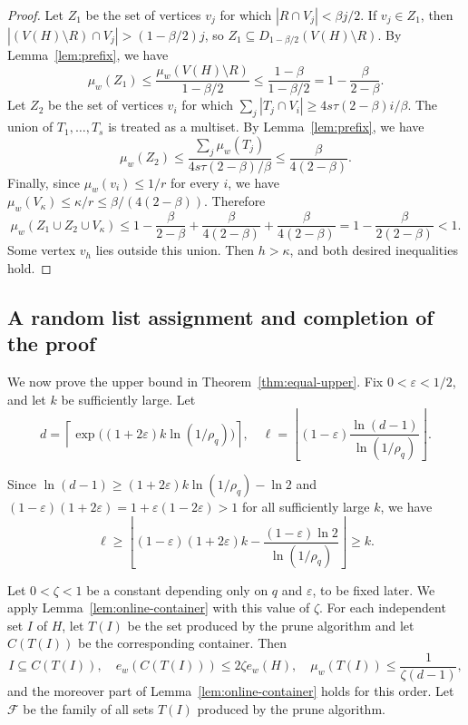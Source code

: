 \documentclass[12pt]{article}
\numberwithin{equation}{section}
\theoremstyle{definition}
\begin{document}
\begin{proof}
Let $Z_1$ be the set of vertices $v_j$ for which
$|R \cap V_j| < \beta j/2$. If $v_j \in Z_1$, then
$|(V(H) \setminus R) \cap V_j| > (1 - \beta/2)j$, so
$Z_1 \subseteq D_{1 - \beta/2}(V(H) \setminus R)$. By
Lemma~\ref{lem:prefix}, we have
\[
 \mu_w(Z_1) \leq \frac{\mu_w(V(H) \setminus R)}{1 - \beta/2}
 \leq \frac{1 - \beta}{1 - \beta/2}
 = 1 - \frac{\beta}{2 - \beta}.
\]
Let $Z_2$ be the set of vertices $v_i$ for which
$\sum_j |T_j \cap V_i| \geq 4s\tau(2 - \beta)i/\beta$. The union of
$T_1,\ldots,T_s$ is treated as a multiset. By Lemma~\ref{lem:prefix}, we
have
\[
 \mu_w(Z_2)
 \leq \frac{\sum_j \mu_w(T_j)}{4s\tau(2 - \beta)/\beta}
 \leq \frac{\beta}{4(2 - \beta)}.
\]
Finally, since $\mu_w(v_i) \leq 1/r$ for every $i$, we have
$\mu_w(V_\kappa) \leq \kappa/r \leq \beta/(4(2 - \beta))$. Therefore
\[
 \mu_w(Z_1 \cup Z_2 \cup V_\kappa)
 \leq 1 - \frac{\beta}{2 - \beta}
 + \frac{\beta}{4(2 - \beta)} + \frac{\beta}{4(2 - \beta)}
 = 1 - \frac{\beta}{2(2 - \beta)} < 1.
\]
Some vertex $v_h$ lies outside this union. Then $h > \kappa$, and both
desired inequalities hold.
\end{proof}

\subsection{A random list assignment and completion of the proof}

We now prove the upper bound in Theorem~\ref{thm:equal-upper}. Fix
$0<\varepsilon<1/2$, and let $k$ be sufficiently large. Let
\begin{equation}\label{eq:d and ell-choice}
 d=\left\lceil\exp\bigl((1+2\varepsilon)k\ln(1/\rho_q)\bigr)\right\rceil, \quad 
 \ell = \left\lfloor
 (1 - \varepsilon)\frac{\ln(d - 1)}{\ln(1/\rho_q)}
 \right\rfloor.
\end{equation}

Since $\ln(d-1) \geq (1+2\varepsilon)k\ln(1/\rho_q)-\ln 2$ and $(1-\varepsilon)(1+2\varepsilon)
=1+\varepsilon(1-2\varepsilon)>1$ for all sufficiently large $k$, we have
\[
\ell\geq
\left\lfloor
(1-\varepsilon)(1+2\varepsilon)k
-\frac{(1-\varepsilon)\ln2}{\ln(1/\rho_q)}
\right\rfloor
 \geq k.
\]

Let $0 < \zeta < 1$ be a constant depending only on $q$ and $\varepsilon$, to be
fixed later. We apply Lemma~\ref{lem:online-container} with this value of $\zeta$. For
each independent set $I$ of $H$, let $T(I)$ be the set produced by the prune
algorithm and let $C(T(I))$ be the corresponding container. Then
\[
 I \subseteq C(T(I)),
 \quad
 e_w(C(T(I))) \leq 2\zeta e_w(H),
 \quad
 \mu_w(T(I)) \leq \frac{1}{\zeta(d - 1)},
\]
and the moreover part of Lemma~\ref{lem:online-container} holds for this
order. Let $\mathcal{F}$ be the
family of all sets $T(I)$ produced by the prune algorithm.
\end{document}
